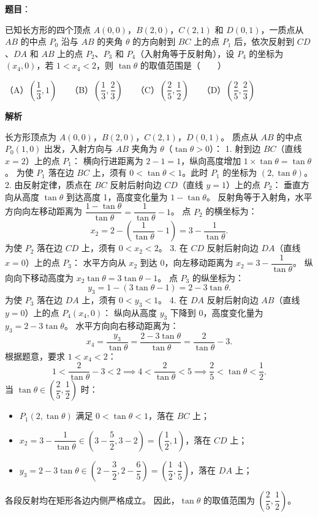 \begin{answer}

\textbf{题目}：

已知长方形的四个顶点 $A(0, 0)$，$B(2, 0)$，$C(2, 1)$ 和 $D(0, 1)$，一质点从 $AB$ 的中点 $P_0$ 沿与 $AB$ 的夹角 $\theta$ 的方向射到 $BC$ 上的点 $P_1$ 后，依次反射到 $CD$、$DA$ 和 $AB$ 上的点 $P_2$、$P_3$ 和 $P_4$（入射角等于反射角），设 $P_4$ 的坐标为 $(x_4, 0)$，若 $1 < x_4 < 2$，则 $\tan\theta$ 的取值范围是\mbox{（　　）}

（A）$\left(\dfrac{1}{3}, 1\right)$　　（B）$\left(\dfrac{1}{3}, \dfrac{2}{3}\right)$　　（C）$\left(\dfrac{2}{5}, \dfrac{1}{2}\right)$　　（D）$\left(\dfrac{2}{5}, \dfrac{2}{3}\right)$

\textbf{解析}

长方形顶点为 $A(0, 0)$，$B(2, 0)$，$C(2, 1)$，$D(0, 1)$。
质点从 $AB$ 的中点 $P_0(1, 0)$ 出发，入射方向与 $AB$ 夹角为 $\theta$（$\tan\theta > 0$）：
1. 射到边 $BC$（直线 $x = 2$）上的点 $P_1$：
   横向行进距离为 $2 - 1 = 1$，纵向高度增加 $1 \times \tan\theta = \tan\theta$。
   为使 $P_1$ 落在边 $BC$ 上，须有 $0 < \tan\theta < 1$。此时 $P_1$ 的坐标为 $(2, \tan\theta)$。
2. 由反射定律，质点在 $BC$ 反射后射向边 $CD$（直线 $y = 1$）上的点 $P_2$：
   垂直方向从高度 $\tan\theta$ 到达高度 1，高度变化量为 $1 - \tan\theta$。
   反射角等于入射角，水平方向向左移动距离为 $\dfrac{1 - \tan\theta}{\tan\theta} = \dfrac{1}{\tan\theta} - 1$。
   点 $P_2$ 的横坐标为：
\nopagebreak[4]
\[x_2 = 2 - \left(\frac{1}{\tan\theta} - 1\right) = 3 - \frac{1}{\tan\theta}.\]
   为使 $P_2$ 落在边 $CD$ 上，须有 $0 < x_2 < 2$。
3. 在 $CD$ 反射后射向边 $DA$（直线 $x = 0$）上的点 $P_3$：
   水平方向从 $x_2$ 到达 $0$，向左移动距离为 $x_2 = 3 - \dfrac{1}{\tan\theta}$。
   纵向向下移动高度为 $x_2 \tan\theta = 3\tan\theta - 1$。
   点 $P_3$ 的纵坐标为：
\nopagebreak[4]
\[y_3 = 1 - (3\tan\theta - 1) = 2 - 3\tan\theta.\]
   为使 $P_3$ 落在边 $DA$ 上，须有 $0 < y_3 < 1$。
4. 在 $DA$ 反射后射向边 $AB$（直线 $y = 0$）上的点 $P_4(x_4, 0)$：
   纵向从高度 $y_3$ 下降到 0，高度变化量为 $y_3 = 2 - 3\tan\theta$。
   水平方向向右移动距离为：
\nopagebreak[4]
\[x_4 = \frac{y_3}{\tan\theta} = \frac{2 - 3\tan\theta}{\tan\theta} = \frac{2}{\tan\theta} - 3.\]
根据题意，要求 $1 < x_4 < 2$：
\nopagebreak[4]
\[1 < \frac{2}{\tan\theta} - 3 < 2 \implies 4 < \frac{2}{\tan\theta} < 5 \implies \frac{2}{5} < \tan\theta < \frac{1}{2}.\]
当 $\tan\theta \in \left(\dfrac{2}{5}, \dfrac{1}{2}\right)$ 时：
\begin{itemize}
\item $P_1(2, \tan\theta)$ 满足 $0 < \tan\theta < 1$，落在 $BC$ 上；
\item $x_2 = 3 - \dfrac{1}{\tan\theta} \in (3 - \dfrac{5}{2}, 3 - 2) = \left(\dfrac{1}{2}, 1\right)$，落在 $CD$ 上；
\item $y_3 = 2 - 3\tan\theta \in \left(2 - \dfrac{3}{2}, 2 - \dfrac{6}{5}\right) = \left(\dfrac{1}{2}, \dfrac{4}{5}\right)$，落在 $DA$ 上；
\end{itemize}
各段反射均在矩形各边内侧严格成立。
因此，$\tan\theta$ 的取值范围为 $\left(\dfrac{2}{5}, \dfrac{1}{2}\right)$。


\end{answer}
